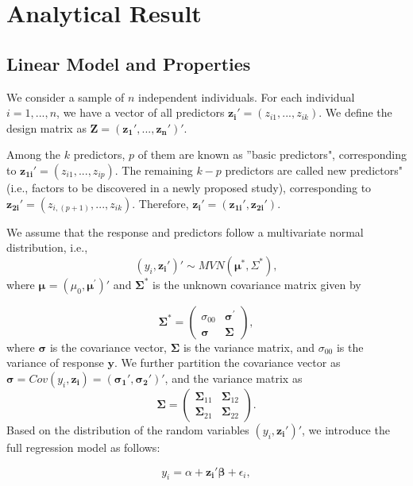 \chapter{Analytical Result}
\section{Linear Model and Properties}
We consider a sample of $n$ independent individuals. For each individual $i = 1, ..., n$, we have a vector of all predictors $\boldsymbol{z_i}' = (z_{i1},..., z_{ik})$. We define the design matrix as $\boldsymbol{Z} = (\boldsymbol{z_1}', ..., \boldsymbol{z_n}')'$.

Among the $k$ predictors, $p$ of them are known as ''basic predictors", corresponding to $\boldsymbol{z_{1i}}' = (z_{i1},..., z_{ip})$. The remaining $k-p$ predictors are called new predictors" (i.e., factors to be discovered in a newly proposed study), corresponding to $\boldsymbol{z_{2i}}' = (z_{i,(p+1)},..., z_{ik})$. Therefore, $\boldsymbol{z_i}' = (\boldsymbol{z_{1i}}', \boldsymbol{z_{2i}}')$.

We assume that the response and predictors follow a multivariate normal distribution, i.e.,
$$
(y_i, \boldsymbol{z_i}')' \sim MVN(\boldsymbol{\mu^*}, {\Sigma}^*),
$$
where $\boldsymbol{\mu^{}}=(\mu_{0},\boldsymbol{\mu^{'}})'$ and ${\boldsymbol{\Sigma}^*}$ is the unknown covariance matrix given by

$${\boldsymbol{\Sigma}^*} = \begin{pmatrix}
\sigma_{00} & \boldsymbol{\sigma^{'}} \\
\boldsymbol{\sigma} & \boldsymbol{\Sigma}
\end{pmatrix},$$
where $\boldsymbol{\sigma}$ is the covariance vector, $\boldsymbol{\Sigma}$ is the variance matrix, and $\sigma_{00}$ is the variance of response $\bm y$. 
We further partition the covariance vector as $\boldsymbol{\sigma} = Cov(y_i, \boldsymbol{z_i}) = (\boldsymbol{\sigma_1}', \boldsymbol{\sigma_2}')'$, 
and the variance matrix as
$${\boldsymbol{\Sigma}} =
\begin{pmatrix}
{\boldsymbol{\Sigma}_{11}} & {\boldsymbol{\Sigma}_{12}} \\
{\boldsymbol{\Sigma}_{21}} & {\boldsymbol{\Sigma}_{22}}
\end{pmatrix}.$$
Based on the distribution of the random variables $(y_i, \boldsymbol{z_i}')'$, we introduce the full regression model as follows:
 
$$
y_i = \alpha + \boldsymbol{z_i}'\boldsymbol{\beta} + \epsilon_i,
$$

